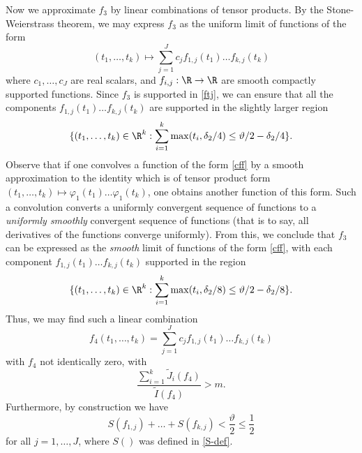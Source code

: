 Now we approximate $f_3$ by linear combinations of tensor products.  By the Stone-Weierstrass theorem, we may express $f_3$ as the uniform limit of functions
of the form
\begin{equation}\label{cff}
 (t_1,\dots,t_k) \mapsto \sum_{j=1}^J c_j f_{1,j}(t_1) \dots f_{k,j}(t_k)
\end{equation}
where $c_1,\dots,c_J$ are real scalars, and $f_{i,j}: \R \to \R$ are smooth compactly supported functions.  Since $f_3$ is supported in \eqref{ftj}, we can ensure that all the components $f_{1,j}(t_1) \dots f_{k,j}(t_k)$ are supported in the slightly larger region
$$ \{ (t_1,\dots,t_k) \in \R^k: \sum_{i=1}^k \max(t_i, \delta_2/4) \leq \vartheta/2 - \delta_2/4 \}.$$
Observe that if one convolves a function of the form \eqref{cff} by a smooth approximation to the identity which is of tensor product form $(t_1,\dots,t_k) \mapsto \varphi_1(t_1) \dots \varphi_1(t_k)$, one obtains another function of this form.  Such a convolution converts a uniformly convergent sequence of functions to a \emph{uniformly smoothly} convergent sequence of functions (that is to say, all derivatives of the functions converge uniformly).  From this, we conclude that $f_3$ can be expressed as the \emph{smooth} limit of functions of the form \eqref{cff}, with each component $f_{1,j}(t_1) \dots f_{k,j}(t_k)$ supported in the region
$$ \{ (t_1,\dots,t_k) \in \R^k: \sum_{i=1}^k \max(t_i, \delta_2/8) \leq \vartheta/2 - \delta_2/8 \}.$$
Thus, we may find such a linear combination
\begin{equation}\label{f4}
 f_4(t_1,\dots,t_k) = \sum_{j=1}^J c_j f_{1,j}(t_1) \dots f_{k,j}(t_k)
\end{equation}
with $f_4$ not identically zero, with
\begin{equation}\label{jbig-6}
 \frac{\sum_{i=1}^k \tilde J_i(f_4)}{\tilde I(f_4)} > m.
\end{equation}
Furthermore, by construction we have
\begin{equation}\label{sfg}
S(f_{1,j}) + \dots + S(f_{k,j}) < \frac{\vartheta}{2} \leq \frac{1}{2}
\end{equation}
for all $j=1,\dots,J$, where $S()$ was defined in \eqref{S-def}.


